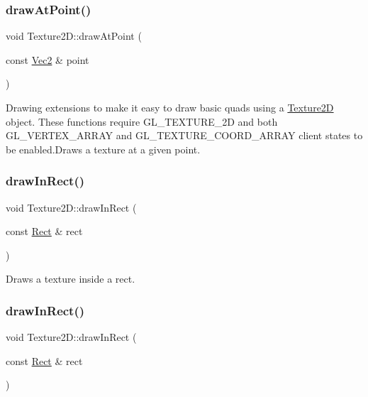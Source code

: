 \subsubsection{\texorpdfstring{draw\+At\+Point()}{drawAtPoint()}\hspace{0.1cm}{\footnotesize\ttfamily [2/2]}}
{\footnotesize\ttfamily void Texture2\+D\+::draw\+At\+Point (\begin{DoxyParamCaption}\item[{const \hyperlink{classVec2}{Vec2} \&}]{point }\end{DoxyParamCaption})}

Drawing extensions to make it easy to draw basic quads using a \hyperlink{classTexture2D}{Texture2D} object. These functions require G\+L\+\_\+\+T\+E\+X\+T\+U\+R\+E\+\_\+2D and both G\+L\+\_\+\+V\+E\+R\+T\+E\+X\+\_\+\+A\+R\+R\+AY and G\+L\+\_\+\+T\+E\+X\+T\+U\+R\+E\+\_\+\+C\+O\+O\+R\+D\+\_\+\+A\+R\+R\+AY client states to be enabled.\+Draws a texture at a given point. \mbox{\label{classTexture2D_aaacff4a0ff5d60af71daa090f6e35654}} 
\subsubsection{\texorpdfstring{draw\+In\+Rect()}{drawInRect()}\hspace{0.1cm}{\footnotesize\ttfamily [1/2]}}
{\footnotesize\ttfamily void Texture2\+D\+::draw\+In\+Rect (\begin{DoxyParamCaption}\item[{const \hyperlink{classRect}{Rect} \&}]{rect }\end{DoxyParamCaption})}

Draws a texture inside a rect. \mbox{\label{classTexture2D_aaacff4a0ff5d60af71daa090f6e35654}} 
\subsubsection{\texorpdfstring{draw\+In\+Rect()}{drawInRect()}\hspace{0.1cm}{\footnotesize\ttfamily [2/2]}}
{\footnotesize\ttfamily void Texture2\+D\+::draw\+In\+Rect (\begin{DoxyParamCaption}\item[{const \hyperlink{classRect}{Rect} \&}]{rect }\end{DoxyParamCaption})}

